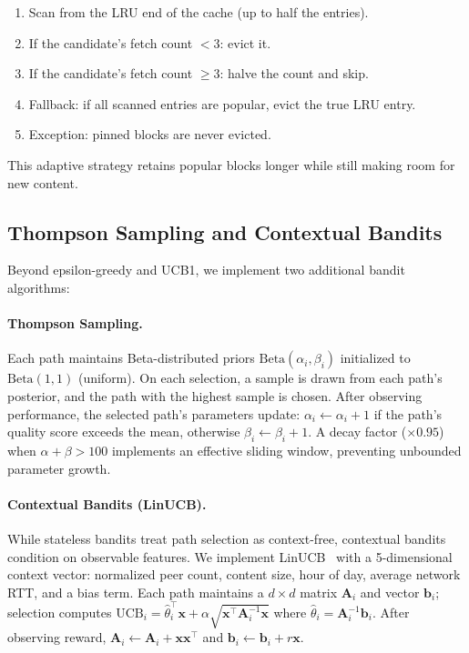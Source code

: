 \documentclass[sigconf,nonacm]{acmart}
\begin{document}
\begin{enumerate}
\item Scan from the LRU end of the cache (up to half the entries).
\item If the candidate's fetch count $< 3$: evict it.
\item If the candidate's fetch count $\geq 3$: halve the count and skip.
\item Fallback: if all scanned entries are popular, evict the true LRU entry.
\item Exception: pinned blocks are never evicted.
\end{enumerate}

This adaptive strategy retains popular blocks longer while still making room for new content.

\subsection{Thompson Sampling and Contextual Bandits}

Beyond epsilon-greedy and UCB1, we implement two additional bandit algorithms:

\paragraph{Thompson Sampling.} Each path maintains Beta-distributed priors $\text{Beta}(\alpha_i, \beta_i)$ initialized to $\text{Beta}(1,1)$ (uniform). On each selection, a sample is drawn from each path's posterior, and the path with the highest sample is chosen. After observing performance, the selected path's parameters update: $\alpha_i \gets \alpha_i + 1$ if the path's quality score exceeds the mean, otherwise $\beta_i \gets \beta_i + 1$. A decay factor ($\times 0.95$) when $\alpha + \beta > 100$ implements an effective sliding window, preventing unbounded parameter growth.

\paragraph{Contextual Bandits (LinUCB).} While stateless bandits treat path selection as context-free, contextual bandits condition on observable features. We implement LinUCB~\cite{li2010linucb} with a 5-dimensional context vector: normalized peer count, content size, hour of day, average network RTT, and a bias term. Each path maintains a $d \times d$ matrix $\mathbf{A}_i$ and vector $\mathbf{b}_i$; selection computes $\text{UCB}_i = \hat{\theta}_i^\top \mathbf{x} + \alpha\sqrt{\mathbf{x}^\top \mathbf{A}_i^{-1} \mathbf{x}}$ where $\hat{\theta}_i = \mathbf{A}_i^{-1} \mathbf{b}_i$. After observing reward, $\mathbf{A}_i \gets \mathbf{A}_i + \mathbf{x}\mathbf{x}^\top$ and $\mathbf{b}_i \gets \mathbf{b}_i + r\mathbf{x}$.
\end{document}
